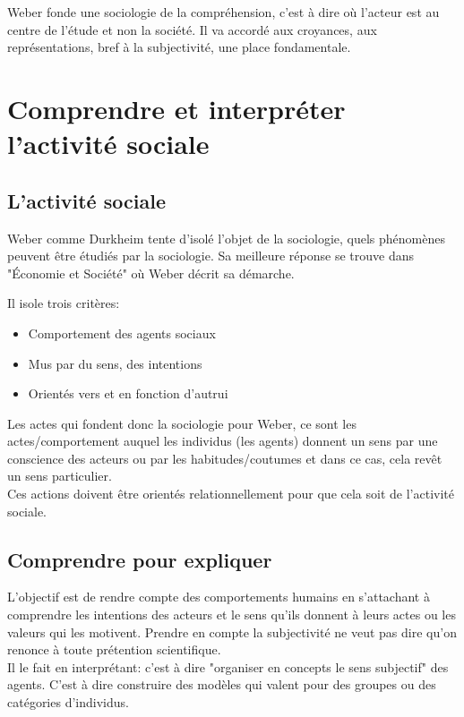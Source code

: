 \documentclass[10pt, a4paper, openany]{book}
\begin{document}
Weber fonde une sociologie de la compréhension, c'est à dire où l'acteur est au centre de l'étude et non la société. Il va accordé aux croyances, aux représentations, bref à la subjectivité, une place fondamentale.


\section{Comprendre et interpréter l'activité sociale}

\subsection{L'activité sociale}

Weber comme Durkheim tente d'isolé l'objet de la sociologie, quels phénomènes peuvent être étudiés par la sociologie. Sa meilleure réponse se trouve dans "Économie et Société" où Weber décrit sa démarche.


Il isole trois critères:
\begin{itemize}
\item Comportement des agents sociaux
\item Mus par du sens, des intentions
\item Orientés vers et en fonction d'autrui
\end{itemize}

Les actes qui fondent donc la sociologie pour Weber, ce sont les actes/comportement auquel les individus (les agents) donnent un sens par une conscience des acteurs ou par les habitudes/coutumes et dans ce cas, cela revêt un sens particulier. \\
Ces actions doivent être orientés relationnellement pour que cela soit de l'activité sociale.

\subsection{Comprendre pour expliquer}

L'objectif est de rendre compte des comportements humains en s'attachant à comprendre les intentions des acteurs et le sens qu'ils donnent à leurs actes ou les valeurs qui les motivent. Prendre en compte la subjectivité ne veut pas dire qu'on renonce à toute prétention scientifique. \\
Il le fait en interprétant: c'est à dire "organiser en concepts le sens subjectif" des agents. C'est à dire construire des modèles qui valent pour des groupes ou des catégories d'individus. 
\end{document}
